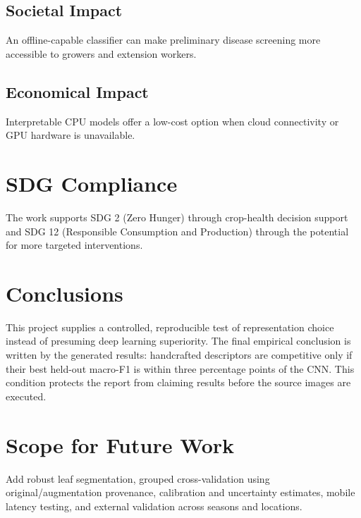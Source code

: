 \subsection{Societal Impact} An offline-capable classifier can make preliminary disease screening more accessible to growers and extension workers.
\subsection{Economical Impact} Interpretable CPU models offer a low-cost option when cloud connectivity or GPU hardware is unavailable.
\section{SDG Compliance}
The work supports SDG 2 (Zero Hunger) through crop-health decision support and SDG 12 (Responsible Consumption and Production) through the potential for more targeted interventions.
\section{Conclusions}
This project supplies a controlled, reproducible test of representation choice instead of presuming deep learning superiority. The final empirical conclusion is written by the generated results: handcrafted descriptors are competitive only if their best held-out macro-F1 is within three percentage points of the CNN. This condition protects the report from claiming results before the source images are executed.
\section{Scope for Future Work}
Add robust leaf segmentation, grouped cross-validation using original/augmentation provenance, calibration and uncertainty estimates, mobile latency testing, and external validation across seasons and locations.

